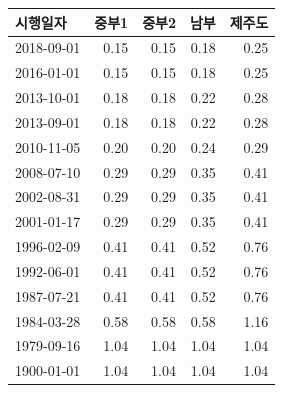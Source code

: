 \begin{defaulttable}
  \caption{\texttt{@vintage\_regulation} 최상층 지붕에 적용되는 열관류율
    $[\mathrm{W/(m^2K)}]$}
  \label{tbl:unknown-db-roof}
  {\small
  \renewcommand{\arraystretch}{1.05}
  \begin{tabular}{lrrrr}
    \toprule
    시행일자 & 중부1 & 중부2 & 남부 & 제주도 \\ \midrule
    2018-09-01 & 0.15 & 0.15 & 0.18 & 0.25 \\
    2016-01-01 & 0.15 & 0.15 & 0.18 & 0.25 \\
    2013-10-01 & 0.18 & 0.18 & 0.22 & 0.28 \\
    2013-09-01 & 0.18 & 0.18 & 0.22 & 0.28 \\
    2010-11-05 & 0.20 & 0.20 & 0.24 & 0.29 \\
    2008-07-10 & 0.29 & 0.29 & 0.35 & 0.41 \\
    2002-08-31 & 0.29 & 0.29 & 0.35 & 0.41 \\
    2001-01-17 & 0.29 & 0.29 & 0.35 & 0.41 \\
    1996-02-09 & 0.41 & 0.41 & 0.52 & 0.76 \\
    1992-06-01 & 0.41 & 0.41 & 0.52 & 0.76 \\
    1987-07-21 & 0.41 & 0.41 & 0.52 & 0.76 \\
    1984-03-28 & 0.58 & 0.58 & 0.58 & 1.16 \\
    1979-09-16 & 1.04 & 1.04 & 1.04 & 1.04 \\
    1900-01-01 & 1.04 & 1.04 & 1.04 & 1.04 \\
    \bottomrule
  \end{tabular}
  }
\end{defaulttable}

